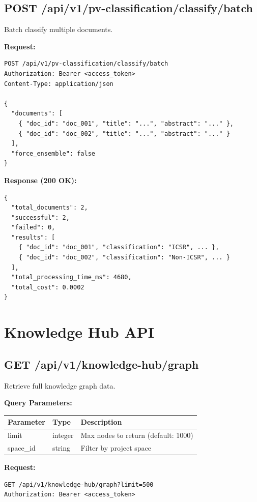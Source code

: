\subsection{POST /api/v1/pv-classification/classify/batch}

Batch classify multiple documents.

\textbf{Request:}
\begin{lstlisting}[style=pythonstyle]
POST /api/v1/pv-classification/classify/batch
Authorization: Bearer <access_token>
Content-Type: application/json

{
  "documents": [
    { "doc_id": "doc_001", "title": "...", "abstract": "..." },
    { "doc_id": "doc_002", "title": "...", "abstract": "..." }
  ],
  "force_ensemble": false
}
\end{lstlisting}

\textbf{Response (200 OK):}
\begin{lstlisting}[style=pythonstyle]
{
  "total_documents": 2,
  "successful": 2,
  "failed": 0,
  "results": [
    { "doc_id": "doc_001", "classification": "ICSR", ... },
    { "doc_id": "doc_002", "classification": "Non-ICSR", ... }
  ],
  "total_processing_time_ms": 4680,
  "total_cost": 0.0002
}
\end{lstlisting}

\section{Knowledge Hub API}

\subsection{GET /api/v1/knowledge-hub/graph}

Retrieve full knowledge graph data.

\textbf{Query Parameters:}
\begin{table}[h]
\centering
\begin{tabularx}{\textwidth}{llX}
\toprule
\textbf{Parameter} & \textbf{Type} & \textbf{Description} \\
\midrule
limit & integer & Max nodes to return (default: 1000) \\
space\_id & string & Filter by project space \\
\bottomrule
\end{tabularx}
\end{table}

\textbf{Request:}
\begin{lstlisting}[style=bashstyle]
GET /api/v1/knowledge-hub/graph?limit=500
Authorization: Bearer <access_token>
\end{lstlisting}

